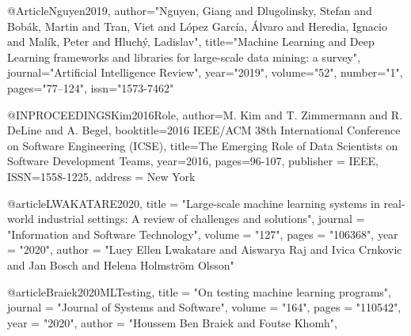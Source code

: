 

@Article{Nguyen2019,
author="Nguyen, Giang
and Dlugolinsky, Stefan
and Bob{\'a}k, Martin
and Tran, Viet
and L{\'o}pez Garc{\'i}a, {\'A}lvaro
and Heredia, Ignacio
and Mal{\'i}k, Peter
and Hluch{\'y}, Ladislav",
title="Machine Learning and Deep Learning frameworks and libraries for large-scale data mining: a survey",
journal="Artificial Intelligence Review",
year="2019",
volume="52",
number="1",
pages="77--124",
issn="1573-7462"
}



@INPROCEEDINGS{Kim2016Role,
author={M. {Kim} and T. {Zimmermann} and R. {DeLine} and A. {Begel}},
booktitle={2016 IEEE/ACM 38th International Conference on Software Engineering (ICSE)},
title={The Emerging Role of Data Scientists on Software Development Teams},
year={2016},
pages={96-107},
publisher = {IEEE},
ISSN={1558-1225},
address = {New York}}

@article{LWAKATARE2020,
title = "Large-scale machine learning systems in real-world industrial settings: A review of challenges and solutions",
journal = "Information and Software Technology",
volume = "127",
pages = "106368",
year = "2020",
author = "Lucy Ellen Lwakatare and Aiswarya Raj and Ivica Crnkovic and Jan Bosch and Helena Holmström Olsson"}

@article{Braiek2020MLTesting,
title = "On testing machine learning programs",
journal = "Journal of Systems and Software",
volume = "164",
pages = "110542",
year = "2020",
author = "Houssem Ben Braiek and Foutse Khomh",
}


